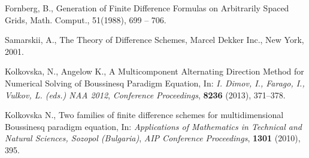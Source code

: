 \documentclass{article}
\begin{document}
\begin{thebibliography}{99}
Fornberg, B., Generation of Finite Difference Formulas on Arbitrarily Spaced Grids, 
Math. Comput., 51(1988),  699 -- 706.

 Samarskii, A., The Theory of Difference Schemes, Marcel Dekker Inc., New York, 2001.

 Kolkovska, N., Angelow K., A Multicomponent Alternating Direction Method for Numerical Solving of Boussinesq Paradigm Equation,
In: {\it  I. Dimov, I., Farago, I., Vulkov, L. (eds.) NAA 2012},
\emph{Conference Proceedings}, \textbf{8236} (2013), 371–378.

 Kolkovska N., Two families of finite difference schemes for multidimensional Boussinesq paradigm equation, In:
{\it Applications of Mathematics in Technical and Natural Sciences,  Sozopol (Bulgaria)},
\emph{AIP Conference Proceedings}, \textbf{1301} (2010), 395.

\end{thebibliography}
\end{document}
